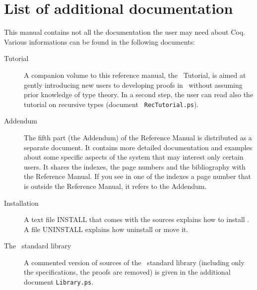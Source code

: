 \section*{List of additional documentation}

This manual contains not all the documentation the user may need about
Coq. Various informations can be found in the following documents: 

\begin{description}

\item[Tutorial] 
  A companion volume to this reference manual, the \Coq\ Tutorial, is
  aimed at gently introducing new users to developing proofs in \Coq\
  without assuming prior knowledge of type theory. In a second step, the
  user can read also the tutorial on recursive types (document {\tt
    RecTutorial.ps}).

\item[Addendum] The fifth part (the Addendum) of the Reference Manual
  is distributed as a separate document. It contains more
  detailed documentation and examples about some specific aspects of the
  system that may interest only certain users. It shares the indexes,
  the page numbers and
  the bibliography with the Reference Manual. If you see in one of the
  indexes a page number that is outside the Reference Manual, it refers
  to the Addendum. 

\item[Installation] A text file INSTALL that comes with the sources
  explains how to install \Coq. A file UNINSTALL explains how
  uninstall or move it.

\item[The \Coq\ standard library]
A commented version of sources of the \Coq\ standard library
(including only the specifications, the proofs are removed) 
is given in the additional document {\tt Library.ps}.

\end{description}




